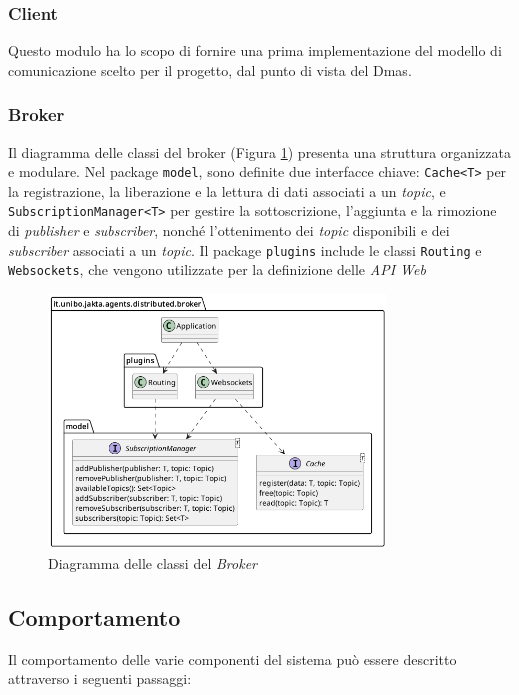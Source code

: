 \subsubsection{Client}
Questo modulo ha lo scopo di fornire una prima implementazione del modello di comunicazione scelto per il progetto, dal punto di vista del Dmas.

\subsubsection{Broker}

Il diagramma delle classi del broker (Figura \ref{fig:broker-class-diagram}) presenta una struttura organizzata e modulare. Nel package \texttt{model}, sono definite due interfacce chiave: \texttt{Cache<T>} per la registrazione, la liberazione e la lettura di dati associati a un \textit{topic}, e \texttt{SubscriptionManager<T>} per gestire la sottoscrizione, l'aggiunta e la rimozione di \textit{publisher} e \textit{subscriber}, nonché l'ottenimento dei \textit{topic} disponibili e dei \textit{subscriber} associati a un \textit{topic}. Il package \texttt{plugins} include le classi \texttt{Routing} e \texttt{Websockets}, che vengono utilizzate per la definizione delle \textit{API Web}

\begin{figure}[ht!]
    \centering
    \includegraphics[width=0.8\textwidth]{figures/broker-class-diagram.png}
    \caption{Diagramma delle classi del \textit{Broker}}
    \label{fig:broker-class-diagram}
\end{figure}

\subsection{Comportamento}
Il comportamento delle varie componenti del sistema può essere descritto attraverso i seguenti passaggi:

